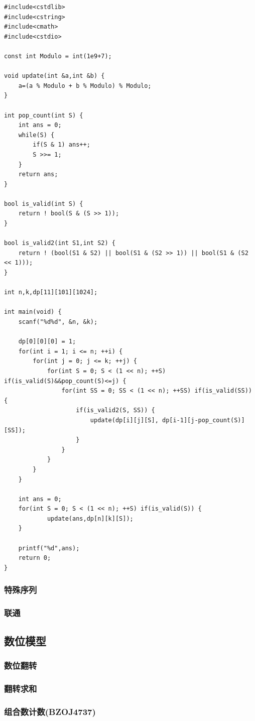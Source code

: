 \documentclass{article}
\begin{document}
\begin{verbatim}
#include<cstdlib>
#include<cstring>
#include<cmath>
#include<cstdio>

const int Modulo = int(1e9+7);

void update(int &a,int &b) {
    a=(a % Modulo + b % Modulo) % Modulo;
}

int pop_count(int S) {
    int ans = 0;
    while(S) {
        if(S & 1) ans++;
        S >>= 1;
    }
    return ans;
}

bool is_valid(int S) {
    return ! bool(S & (S >> 1));
}

bool is_valid2(int S1,int S2) {
    return ! (bool(S1 & S2) || bool(S1 & (S2 >> 1)) || bool(S1 & (S2 << 1)));
}

int n,k,dp[11][101][1024];

int main(void) {
    scanf("%d%d", &n, &k);

    dp[0][0][0] = 1;
    for(int i = 1; i <= n; ++i) {
        for(int j = 0; j <= k; ++j) {
            for(int S = 0; S < (1 << n); ++S) if(is_valid(S)&&pop_count(S)<=j) {
                for(int SS = 0; SS < (1 << n); ++SS) if(is_valid(SS)) {
                    if(is_valid2(S, SS)) {
                        update(dp[i][j][S], dp[i-1][j-pop_count(S)][SS]);
                    }
                }
            }
        }
    }

    int ans = 0;
    for(int S = 0; S < (1 << n); ++S) if(is_valid(S)) {
            update(ans,dp[n][k][S]);
    }

    printf("%d",ans);
    return 0;
}
\end{verbatim}

\subsubsection{特殊序列}
\subsubsection{联通}
\subsection{数位模型}
\subsubsection{数位翻转}
\subsubsection{翻转求和}
\subsubsection{组合数计数(BZOJ4737)}
\end{document}
